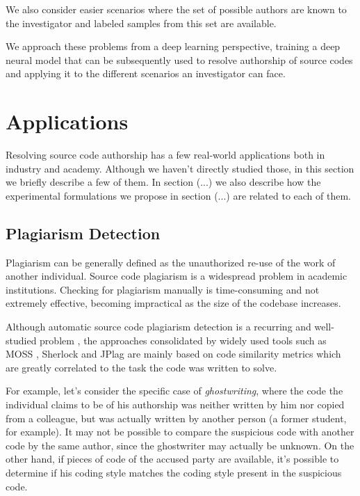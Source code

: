 We also consider easier scenarios where the set of possible authors are known to the investigator and labeled samples from this set are available. %

We approach these problems from a deep learning perspective, training a deep neural model that can be subsequently used to resolve authorship of source codes and applying it to the different scenarios an investigator can face.

\section{Applications}

Resolving source code authorship has a few real-world applications both in industry and academy. Although we haven't directly studied those, in this section we briefly describe a few of them. In section (...) we also describe how the experimental formulations we propose in section (...) are related to each of them.

\subsection{Plagiarism Detection}

Plagiarism can be generally defined as the unauthorized re-use of the work of another individual. Source code plagiarism is a widespread problem in academic institutions. Checking for plagiarism manually is time-consuming and not extremely effective, becoming impractical as the size of the codebase increases.

Although automatic source code plagiarism detection is a recurring and well-studied problem \cite{plag_survey}, the approaches consolidated by widely used tools such as MOSS \cite{moss}, Sherlock and JPlag \cite{jplag} are mainly based on code similarity metrics which are greatly correlated to the task the code was written to solve.%

For example, let's consider the specific case of \textit{ghostwriting}, where the code the individual claims to be of his authorship was neither written by him nor copied from a colleague, but was actually written by another person (a former student, for example).  It may not be possible to compare the suspicious code with another code by the same author, since the ghostwriter may actually be unknown. On the other hand, if pieces of code of the accused party are available, it's possible to determine if his coding style matches the coding style present in the suspicious code.

